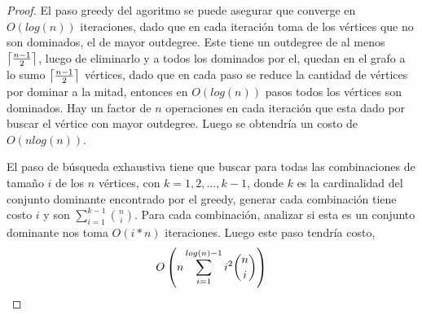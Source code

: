 \documentclass{article}
\begin{document}
\begin{proof}
	El paso greedy del agoritmo se puede asegurar que converge en $O(log(n))$ 
	iteraciones, dado que en cada iteración toma de los vértices que no son
	dominados, el de mayor outdegree. Este tiene un outdegree de al menos
	$\left \lceil \frac{n-1}{2} \right \rceil$, luego de eliminarlo y a todos los dominados por el,
	quedan en el grafo a lo sumo $\left \lceil \frac{n-1}{2} \right \rceil$ vértices, dado que en
	cada paso se reduce la cantidad de vértices por dominar a la mitad, entonces en 
	$O(log(n))$ pasos todos los vértices son dominados. Hay un factor de $n$ 
	operaciones en cada iteración que esta dado por buscar el vértice con mayor
	outdegree. Luego se obtendría un costo de $O(nlog(n))$.

	El paso de búsqueda exhaustiva tiene que buscar para todas las combinaciones de 
	tamaño $i$ de los $n$ vértices, con $k=1,2,\dots,k-1$, donde $k$ es la 
	cardinalidad del conjunto dominante encontrado por el greedy, generar cada 
	combinación tiene costo $i$ y son $\sum_{i=1}^{k-1}\binom{n}{i}$. Para cada 
	combinación, analizar si esta es un conjunto dominante nos toma $O(i*n)$ 
	iteraciones. Luego este paso tendría costo,
	$$O\left( n\sum_{i=1}^{log(n)-1}i^2 \binom{n}{i} \right)$$

\end{proof}
\end{document}
